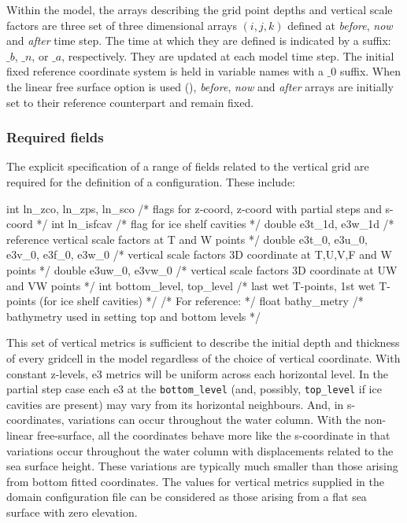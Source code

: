 \documentclass[../main/NEMO_manual]{subfiles}
\begin{document}
Within the model,
the arrays describing the grid point depths and vertical scale factors are
three set of three dimensional arrays $(i,j,k)$ defined at
\textit{before}, \textit{now} and \textit{after} time step.
The time at which they are defined is indicated by a suffix: $\_b$, $\_n$, or $\_a$, respectively.
They are updated at each model time step.
The initial fixed reference coordinate system is held in variable names with a $\_0$ suffix.
When the linear free surface option is used (),
\textit{before}, \textit{now} and \textit{after} arrays are initially set to
their reference counterpart and remain fixed.

\subsubsection{Required fields}
\label{sec:DOM_zgr_fields}

The explicit specification of a range of fields related to the vertical grid are required for
the definition of a configuration.
These include:

\begin{forlines}
int    ln_zco, ln_zps, ln_sco            /* flags for z-coord, z-coord with partial steps and s-coord    */
int    ln_isfcav                         /* flag  for ice shelf cavities                                 */
double e3t_1d, e3w_1d                    /* reference vertical scale factors at T and W points           */
double e3t_0, e3u_0, e3v_0, e3f_0, e3w_0 /* vertical scale factors 3D coordinate at T,U,V,F and W points */
double e3uw_0, e3vw_0                    /* vertical scale factors 3D coordinate at UW and VW points     */
int    bottom_level, top_level           /* last wet T-points, 1st wet T-points (for ice shelf cavities) */
                                         /* For reference:                                               */
float  bathy_metry                       /* bathymetry used in setting top and bottom levels             */
\end{forlines}

This set of vertical metrics is sufficient to describe the initial depth and thickness of
every gridcell in the model regardless of the choice of vertical coordinate.
With constant z-levels, e3 metrics will be uniform across each horizontal level.
In the partial step case each e3 at the \texttt{bottom\_level}
(and, possibly, \texttt{top\_level} if ice cavities are present)
may vary from its horizontal neighbours.
And, in s-coordinates, variations can occur throughout the water column.
With the non-linear free-surface, all the coordinates behave more like the s-coordinate in that
variations occur throughout the water column with displacements related to the sea surface height.
These variations are typically much smaller than those arising from bottom fitted coordinates.
The values for vertical metrics supplied in the domain configuration file can be considered as
those arising from a flat sea surface with zero elevation.
\end{document}
